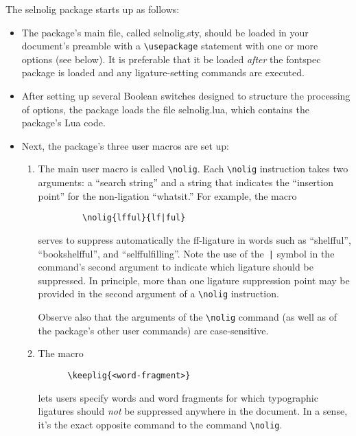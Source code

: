 \documentclass[12pt]{article}
\newcommand{\pkg}[1]{\textsf{#1}}
\newcommand{\cmmd}[1]{\texttt{\textbackslash #1}}
\begin{document}
The \pkg{selnolig} package starts up as follows:
\begin{itemize}
\item The package's main file, called \pkg{selnolig.sty}, should be loaded in your document's preamble with a \cmmd{usepackage} statement with one or more options (see below). It is preferable that it be loaded \emph{after} the \pkg{fontspec} package is loaded and any ligature-setting commands are executed.
\item After setting up several Boolean switches designed to structure the processing of options, the package loads the file \pkg{selnolig.lua}, which contains the package's Lua code.
\item Next, the package's three user macros are set up:
\begin{enumerate}
\item The main user macro is called \cmmd{nolig}. Each \cmmd{nolig} instruction takes two arguments: a \enquote{search string} and a string that indicates the \enquote{insertion point} for the non-ligation \enquote{whatsit.} For example, the macro
    \begin{Verbatim}
         \nolig{lfful}{lf|ful}
    \end{Verbatim}
serves to suppress automatically the ff-ligature in words such as \enquote{shelfful}, \enquote{bookshelfful}, and \enquote{selffulfilling}. Note the use of the~\Verb/|/ symbol in the command's second argument to indicate which ligature should be suppressed. In principle, more than one ligature suppression point may be provided in the second argument of a \cmmd{nolig} instruction.

Observe also that the arguments of the \cmmd{nolig} command (as well as of the package's other user commands) are case-sensitive. 

\item The macro 
\begin{Verbatim}
      \keeplig{<word-fragment>}
\end{Verbatim}
lets users specify words and word fragments for which typographic ligatures should \emph{not} be suppressed anywhere in the document. In a sense, it's the exact opposite command to the command \cmmd{nolig}. 


\end{enumerate}
\end{itemize}
\end{document}
